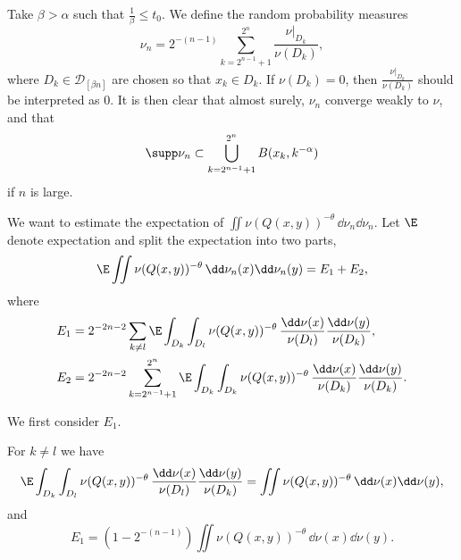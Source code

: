 Take $\beta > \alpha$ such that $\frac{1}{\beta} \leq t_0$. We define the random probability measures
\[
\nu_n = 2^{-(n-1)} \sum_{k=2^{n-1}+1}^{2^n} \frac{\nu|_{D_k}}{\nu (D_k)},
\]
where $D_k \in \mathscr{D}_{[\beta n]}$ are chosen so that $x_k \in D_k$. If $\nu (D_k) = 0$, then $\frac{\nu|_{D_k}}{\nu (D_k)}$ should be interpreted as $0$. It is then clear that almost surely, $\nu_n$ converge weakly to $\nu$, and that
\[
\supp \nu_n \subset \bigcup_{k=2^{n-1}+1}^{2^n} B (x_k, k^{-\alpha})
\]
if $n$ is large.

We want to estimate the expectation of $\iint \nu(Q(x,y))^{-\theta} \,
\dd \nu_n \dd \nu_n$. Let $\E$ denote expectation and split the expectation into two parts,
\[
\E \iint \nu (Q(x,y))^{-\theta} \, \dd \nu_n (x) \dd
\nu_n (y) = E_1 + E_2,
\]
where
\begin{align*}
E_1 &= 2^{-2n-2} \sum_{k \neq l} \E \int_{D_k} \int_{D_l} \nu (Q(x,y))^{-\theta} \, \frac{\dd \nu (x)}{\nu (D_l)}
\frac{\dd \nu (y)}{\nu (D_k)}, \\ E_2 &= 2^{-2n-2}
\sum_{k=2^{n-1}+1}^{2^n} \E \int_{D_k} \int_{D_k} \nu (Q(x,y))^{-\theta} \, \frac{\dd \nu (x)}{\nu (D_k)}
\frac{\dd \nu (y)}{\nu (D_k)}.
\end{align*}

We first consider $E_1$.

\begin{lemm}\label{lem:E1}
For $k \neq l$ we have
\[
\E \int_{D_k} \int_{D_l} \nu (Q(x,y))^{-\theta} \, \frac{\dd
\nu (x)}{\nu (D_l)} \frac{\dd \nu (y)}{\nu (D_k)} = \iint
\nu(Q(x,y))^{-\theta} \, \dd \nu (x) \dd \nu (y),
\]
and
\[
E_1 = (1 - 2^{-(n-1)}) \iint \nu(Q(x,y))^{-\theta} \, \dd \nu (x) \dd \nu (y).
\]
\end{lemm}


